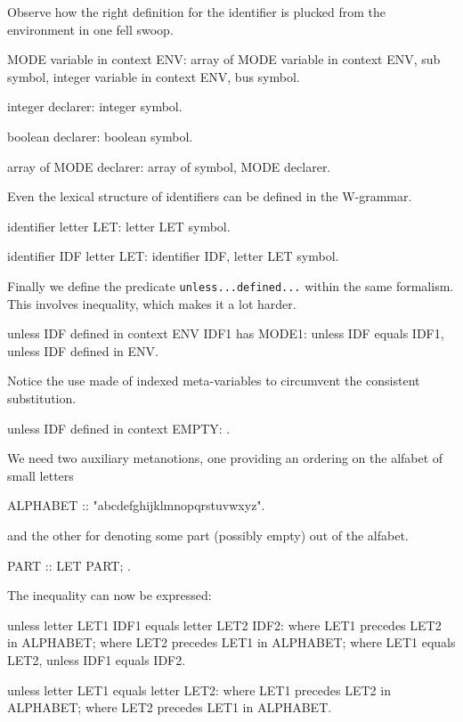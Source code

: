 Observe how the right definition for the identifier is plucked from the
environment in one fell swoop.
\begin{elan}
MODE variable in context ENV:
   array of MODE variable in context ENV,
      sub symbol, integer variable in context ENV, bus symbol.
\end{elan}
\begin{elan}
integer declarer: integer symbol.
\end{elan}
\begin{elan}
boolean declarer: boolean symbol.
\end{elan}
\begin{elan}
array of MODE declarer: array of symbol, MODE declarer.
\end{elan}
Even the lexical structure of identifiers can be defined in the W-grammar.
\begin{elan}
identifier letter LET: letter LET symbol.
\end{elan}
\begin{elan}
identifier IDF letter LET: identifier IDF, letter LET symbol.
\end{elan}
Finally we define the predicate
{\tt unless...defined...} within the same formalism.
This involves inequality, which makes it a lot harder.
\begin{elan}
unless IDF defined in context ENV IDF1 has MODE1:
   unless IDF equals IDF1, unless IDF defined in ENV.
\end{elan}
Notice the use made of indexed meta-variables to circumvent the
consistent substitution.
\begin{elan}
unless IDF defined in context EMPTY: .
\end{elan}
We need two auxiliary metanotions, one providing an ordering on the alfabet
of small letters
\begin{elan}
ALPHABET :: "abcdefghijklmnopqrstuvwxyz".
\end{elan}
and the other for denoting some part (possibly empty) out of the alfabet.
\begin{elan}
PART :: LET PART; .
\end{elan}
The inequality can now be expressed:
\begin{elan}
unless letter LET1 IDF1 equals letter LET2 IDF2:
   where LET1 precedes LET2 in ALPHABET;
   where LET2 precedes LET1 in ALPHABET;
   where LET1 equals LET2, unless IDF1 equals IDF2.
\end{elan}
\begin{elan}
unless letter LET1 equals letter LET2:
   where LET1 precedes LET2 in ALPHABET;
   where LET2 precedes LET1 in ALPHABET.
\end{elan}
